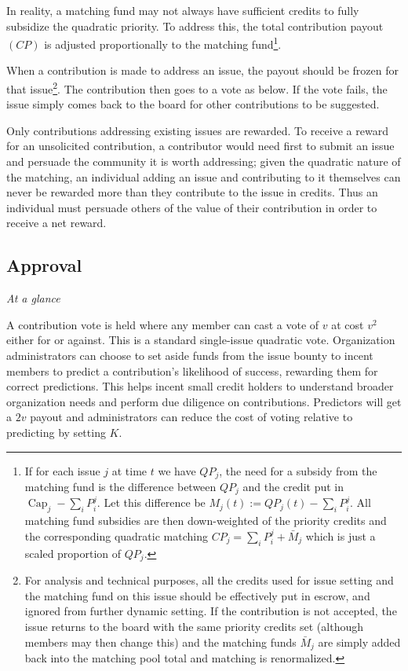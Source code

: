 \documentclass{article}
\begin{document}
In reality, a matching fund may not always have sufficient credits to fully subsidize the quadratic priority. To address this, the total contribution payout $(CP)$ is adjusted proportionally to the matching fund\footnote{If for each issue $j$ at time $t$ we have $QP_j$, the need for a subsidy from the matching fund is the difference between $QP_j$ and the credit put in $\operatorname{Cap}_j - \sum_i P_i^j$. Let this difference be $M_j(t) := QP_j(t) - \sum_i P_i^j$. All matching fund subsidies are then down-weighted of the priority credits and the corresponding quadratic matching $CP_j = \sum_i P_i^j + \bar{M}_j$ which is just a scaled proportion of $QP_j$.}.

When a contribution is made to address an issue, the payout should be frozen for that issue\footnote{For analysis and technical purposes, all the credits used for issue setting and the matching fund on this issue should be effectively put in escrow, and ignored from further dynamic setting. If the contribution is not accepted, the issue returns to the board with the same priority credits set (although members may then change this) and the matching funds $\bar{M}_j$ are simply added back into the matching pool total and matching is renormalized.}. The contribution then goes to a vote as below. If the vote fails, the issue simply comes back to the board for other contributions to be suggested.

Only contributions addressing existing issues are rewarded. To receive a reward for an unsolicited contribution, a contributor would need first to submit an issue and persuade the community it is worth addressing; given the quadratic nature of the matching, an individual adding an issue and contributing to it themselves can never be rewarded more than they contribute to the issue in credits. Thus an individual must persuade others of the value of their contribution in order to receive a net reward.

\subsection{Approval}
\textit{At a glance}

A contribution vote is held where any member can cast a vote of $v$ at cost $v^2$ either for or against. This is a standard single-issue quadratic vote. Organization administrators can choose to set aside funds from the issue bounty to incent members to predict a contribution's likelihood of success, rewarding them for correct predictions. This helps incent small credit holders to understand broader organization needs and perform due diligence on contributions. Predictors will get a $2v$ payout and administrators can reduce the cost of voting relative to predicting by setting $K$.
\end{document}
